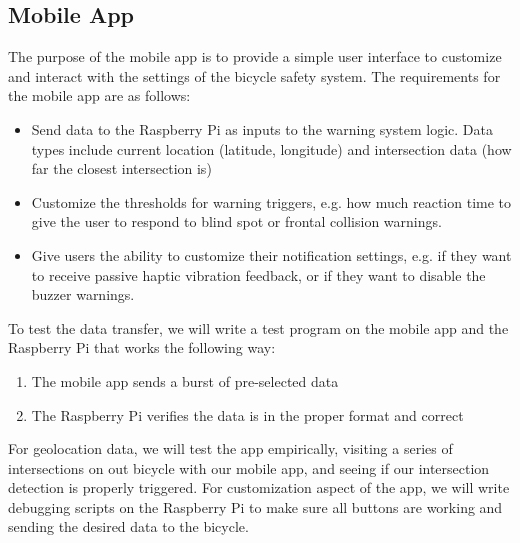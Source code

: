 \documentclass[journal]{IEEEtran}
\begin{document}
\subsection{Mobile App}
The purpose of the mobile app is to provide a simple user interface to customize and interact with the settings of the bicycle safety system. The requirements for the mobile app are as follows:
\begin{itemize}
  \item Send data to the Raspberry Pi as inputs to the warning system logic. Data types include current location (latitude, longitude) and intersection data (how far the closest intersection is)
  \item Customize the thresholds for warning triggers, e.g. how much reaction time to give the user to respond to blind spot or frontal collision warnings.
  \item Give users the ability to customize their notification settings, e.g. if they want to receive passive haptic vibration feedback, or if they want to disable the buzzer warnings.
\end{itemize}
To test the data transfer, we will write a test program on the mobile app and the Raspberry Pi that works the following way:
\begin{enumerate}
    \item The mobile app sends a burst of pre-selected data
    \item The Raspberry Pi verifies the data is in the proper format and correct
\end{enumerate}
For geolocation data, we will test the app empirically, visiting a series of intersections on out bicycle with our mobile app, and seeing if our intersection detection is properly triggered. For customization aspect of the app, we will write debugging scripts on the Raspberry Pi to make sure all buttons are working and sending the desired data to the bicycle.
\end{document}
